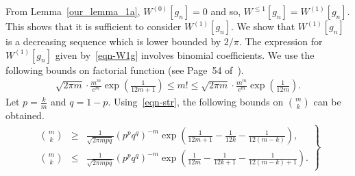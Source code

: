 \documentclass[11pt]{article}
\begin{document}
From Lemma~\ref{our_lemma_1a}, ${W}^{(0)}[g_n]=0$ and so, ${W}^{\leq 1}[g_n]={W}^{(1)}[g_n]$. This shows that it is sufficient to 
consider ${W}^{(1)}[g_n]$.
We show that ${W}^{(1)}[g_n]$ is a decreasing sequence which is lower bounded by $2/\pi$. The expression for ${W}^{(1)}[g_n]$ given 
by~\eqref{eqn-W1g} involves binomial coefficients. We use the following bounds on factorial function (see Page~54 of~\cite{feller1968introduction}).
\begin{eqnarray}\label{eqn-str}
	\sqrt{2\pi m}\cdot \frac{m^m}{e^m}\exp\left(\frac{1}{12m+1}\right) \leq m! \leq \sqrt{2\pi m}\cdot\frac{m^m}{e^m}\exp\left(\frac{1}{12m}\right). 
\end{eqnarray}
Let $p=\frac{k}{m}$ and $q=1-p$. Using~\eqref{eqn-str}, the following bounds on ${m \choose k}$ can be obtained. 
\begin{eqnarray} \label{eqn-bin}
	\left. \begin{array}{rcl}
	{m \choose k} & \geq & \frac{1}{\sqrt{2\pi mpq}}(p^pq^q)^{-m}\exp\left(\frac{1}{12m+1}-\frac{1}{12k}-\frac{1}{12(m-k)}\right), \\ %
	{m \choose k} & \leq & \frac{1}{\sqrt{2\pi mpq}}(p^pq^q)^{-m}\exp\left(\frac{1}{12m}-\frac{1}{12k+1}-\frac{1}{12(m-k)+1}\right). %
	\end{array} \right\}
\end{eqnarray}
\end{document}
